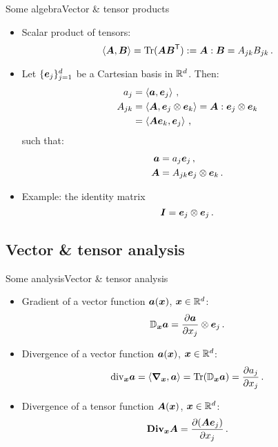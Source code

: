 \begin{frame}{Some algebra}{Vector \& tensor products}


\begin{itemize}
\item Scalar product of tensors:
\begin{displaymath}
\scal{\Av,\Bv}=\trace(\Av\Bv^\itr):=\Av:\Bv=\Aj_{jk}\Bj_{jk}\,.
\end{displaymath}
\item Let $\{\ev_j\}_{j=1}^d$ be a Cartesian basis in $\Rset^d$. Then:
\begin{displaymath}
\begin{split}
\aj_j &=\scal{\av,\ev_j}\,, \\
\Aj_{jk} &=\scal{\Av,\ev_j\otimes\ev_k}=\Av:\ev_j\otimes\ev_k \\
&=\scal{\Av\ev_k,\ev_j}\,,
\end{split}
\end{displaymath}
such that:
\begin{displaymath}
\begin{split}
\av &=\aj_j\ev_j\,, \\
\Av &=\Aj_{jk}\ev_j\otimes\ev_k\,.
\end{split}
\end{displaymath}
\item Example: the identity matrix
\begin{displaymath}
\Id=\ev_j\otimes\ev_j\,.
\end{displaymath}
\end{itemize}


\end{frame}

\subsection{Vector \& tensor analysis}

\begin{frame}{Some analysis}{Vector \& tensor analysis}

\begin{itemize}
\item Gradient of a vector function $\av(\xv)$, $\xv\in\Rset^d$:
\begin{displaymath}
\Gradx\av=\frac{\partial\av}{\partial\xj_j}\otimes\ev_j\,.
\end{displaymath}
\item Divergence of a vector function $\av(\xv)$, $\xv\in\Rset^d$:
\begin{displaymath}
\divx\av=\scal{\gradx,\av}=\trace(\Gradx\av)=\frac{\partial\aj_j}{\partial\xj_j}\,.
\end{displaymath}
\item Divergence of a tensor function $\Av(\xv)$, $\xv\in\Rset^d$:
\begin{displaymath}
\Divx\Av=\frac{\partial(\Av\ev_j)}{\partial\xj_j}\,.
\end{displaymath}
\end{itemize}

\end{frame}

